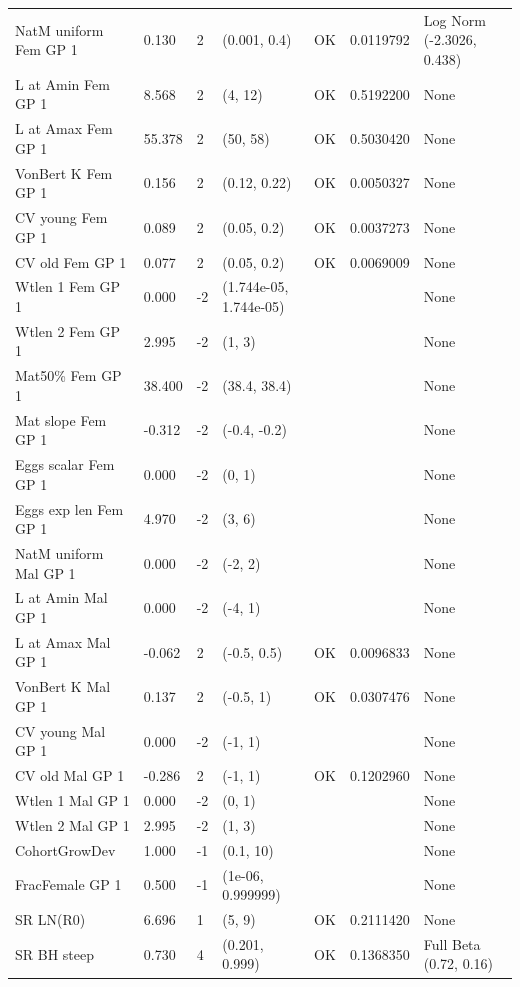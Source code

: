 \documentclass[
  english,
  a4paper,
]{article}
\begin{document}
\begin{landscape}
\begin{longtable}[t]{lllllll}
\endfoot
\bottomrule
\endlastfoot
NatM uniform Fem GP 1 & 0.130 & 2 & (0.001, 0.4) & OK & 0.0119792 & Log Norm (-2.3026, 0.438)\\
L at Amin Fem GP 1 & 8.568 & 2 & (4, 12) & OK & 0.5192200 & None\\
L at Amax Fem GP 1 & 55.378 & 2 & (50, 58) & OK & 0.5030420 & None\\
VonBert K Fem GP 1 & 0.156 & 2 & (0.12, 0.22) & OK & 0.0050327 & None\\
CV young Fem GP 1 & 0.089 & 2 & (0.05, 0.2) & OK & 0.0037273 & None\\
\addlinespace
CV old Fem GP 1 & 0.077 & 2 & (0.05, 0.2) & OK & 0.0069009 & None\\
Wtlen 1 Fem GP 1 & 0.000 & -2 & (1.744e-05, 1.744e-05) &  &  & None\\
Wtlen 2 Fem GP 1 & 2.995 & -2 & (1, 3) &  &  & None\\
Mat50\% Fem GP 1 & 38.400 & -2 & (38.4, 38.4) &  &  & None\\
Mat slope Fem GP 1 & -0.312 & -2 & (-0.4, -0.2) &  &  & None\\
\addlinespace
Eggs scalar Fem GP 1 & 0.000 & -2 & (0, 1) &  &  & None\\
Eggs exp len Fem GP 1 & 4.970 & -2 & (3, 6) &  &  & None\\
NatM uniform Mal GP 1 & 0.000 & -2 & (-2, 2) &  &  & None\\
L at Amin Mal GP 1 & 0.000 & -2 & (-4, 1) &  &  & None\\
L at Amax Mal GP 1 & -0.062 & 2 & (-0.5, 0.5) & OK & 0.0096833 & None\\
\addlinespace
VonBert K Mal GP 1 & 0.137 & 2 & (-0.5, 1) & OK & 0.0307476 & None\\
CV young Mal GP 1 & 0.000 & -2 & (-1, 1) &  &  & None\\
CV old Mal GP 1 & -0.286 & 2 & (-1, 1) & OK & 0.1202960 & None\\
Wtlen 1 Mal GP 1 & 0.000 & -2 & (0, 1) &  &  & None\\
Wtlen 2 Mal GP 1 & 2.995 & -2 & (1, 3) &  &  & None\\
\addlinespace
CohortGrowDev & 1.000 & -1 & (0.1, 10) &  &  & None\\
FracFemale GP 1 & 0.500 & -1 & (1e-06, 0.999999) &  &  & None\\
SR LN(R0) & 6.696 & 1 & (5, 9) & OK & 0.2111420 & None\\
SR BH steep & 0.730 & 4 & (0.201, 0.999) & OK & 0.1368350 & Full Beta (0.72, 0.16)\\

\end{longtable}
\end{landscape}
\end{document}
